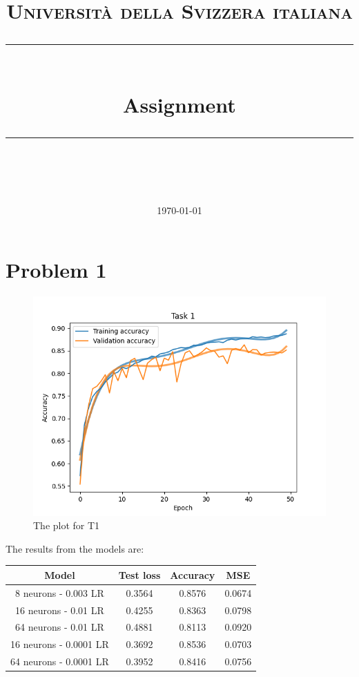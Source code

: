 \documentclass[11pt]{scrartcl}
\title{	
	\normalfont\normalsize
	\textsc{\thecourse\\%
	Università della Svizzera italiana}\\
	\vspace{25pt}
	\rule{\linewidth}{0.5pt}\\
	\vspace{20pt}
	{\huge Assignment \theassnumber}\\
	\vspace{12pt}
	\rule{\linewidth}{0.5pt}\\
	\vspace{12pt}
}
\author{\LARGE \thestudent}
\date{\normalsize\today}
\begin{document}
\maketitle


\section*{Problem 1}

	\begin{figure}[H]
		\centering
		\includegraphics[width=\textwidth]{src/plot_task1.png}
		\caption{The plot for T1}
		\label{fig:plot_T1}
	\end{figure}

	The results from the models are:\\
	
	\begin{table}
		\centering
		\begin{tabular}{cccc}
			Model & Test loss & Accuracy & MSE\\
			\hline
			8 neurons - 0.003 LR & 0.3564 & 0.8576 & 0.0674\\
			16 neurons - 0.01 LR & 0.4255 & 0.8363 & 0.0798\\
			64 neurons - 0.01 LR & 0.4881 & 0.8113 & 0.0920\\
			16 neurons - 0.0001 LR & 0.3692 & 0.8536 & 0.0703\\
			64 neurons - 0.0001 LR & 0.3952 & 0.8416 & 0.0756
		\end{tabular}
	\end{table}
\end{document}
